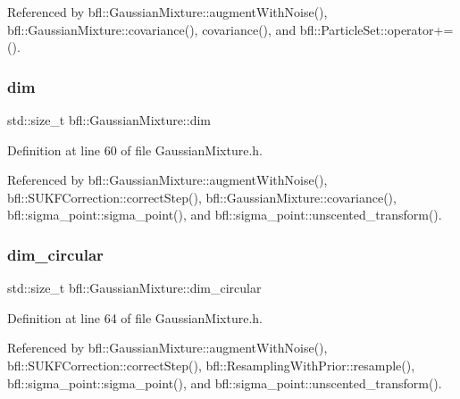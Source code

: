 Referenced by bfl\+::\+Gaussian\+Mixture\+::augment\+With\+Noise(), bfl\+::\+Gaussian\+Mixture\+::covariance(), covariance(), and bfl\+::\+Particle\+Set\+::operator+=().

\mbox{\label{classbfl_1_1GaussianMixture_a3f2b18801e72fa3bf0d6edc778662a8d}} 
\subsubsection{\texorpdfstring{dim}{dim}}
{\footnotesize\ttfamily std\+::size\+\_\+t bfl\+::\+Gaussian\+Mixture\+::dim\hspace{0.3cm}{\ttfamily [inherited]}}



Definition at line 60 of file Gaussian\+Mixture.\+h.



Referenced by bfl\+::\+Gaussian\+Mixture\+::augment\+With\+Noise(), bfl\+::\+S\+U\+K\+F\+Correction\+::correct\+Step(), bfl\+::\+Gaussian\+Mixture\+::covariance(), bfl\+::sigma\+\_\+point\+::sigma\+\_\+point(), and bfl\+::sigma\+\_\+point\+::unscented\+\_\+transform().

\mbox{\label{classbfl_1_1GaussianMixture_a23f3b92753266475a9bff8ee7e1c9518}} 
\subsubsection{\texorpdfstring{dim\+\_\+circular}{dim\_circular}}
{\footnotesize\ttfamily std\+::size\+\_\+t bfl\+::\+Gaussian\+Mixture\+::dim\+\_\+circular\hspace{0.3cm}{\ttfamily [inherited]}}



Definition at line 64 of file Gaussian\+Mixture.\+h.



Referenced by bfl\+::\+Gaussian\+Mixture\+::augment\+With\+Noise(), bfl\+::\+S\+U\+K\+F\+Correction\+::correct\+Step(), bfl\+::\+Resampling\+With\+Prior\+::resample(), bfl\+::sigma\+\_\+point\+::sigma\+\_\+point(), and bfl\+::sigma\+\_\+point\+::unscented\+\_\+transform().

